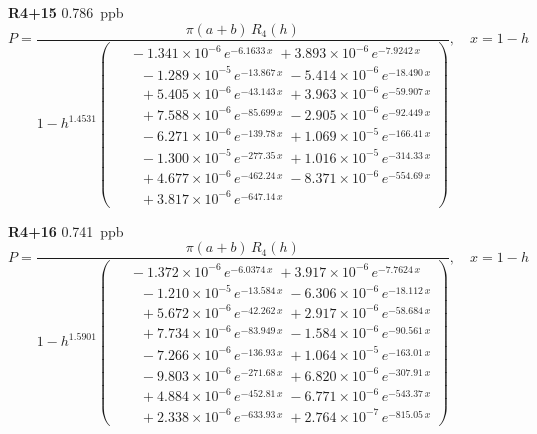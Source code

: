 \documentclass[12pt]{article}
\begin{document}
\noindent\textbf{R4+15} 0.786~ppb\nopagebreak
\begin{equation*}
P = \frac{\pi(a{+}b)\,R_4(h)}{1 - h^{1.4531}\!\left(\!\begin{aligned}
  &\; -1.341{\times}10^{-6}\,e^{-6.1633\,x} \; +3.893{\times}10^{-6}\,e^{-7.9242\,x} \\[-3pt]
  &\quad -1.289{\times}10^{-5}\,e^{-13.867\,x} \; -5.414{\times}10^{-6}\,e^{-18.490\,x} \\[-3pt]
  &\quad +5.405{\times}10^{-6}\,e^{-43.143\,x} \; +3.963{\times}10^{-6}\,e^{-59.907\,x} \\[-3pt]
  &\quad +7.588{\times}10^{-6}\,e^{-85.699\,x} \; -2.905{\times}10^{-6}\,e^{-92.449\,x} \\[-3pt]
  &\quad -6.271{\times}10^{-6}\,e^{-139.78\,x} \; +1.069{\times}10^{-5}\,e^{-166.41\,x} \\[-3pt]
  &\quad -1.300{\times}10^{-5}\,e^{-277.35\,x} \; +1.016{\times}10^{-5}\,e^{-314.33\,x} \\[-3pt]
  &\quad +4.677{\times}10^{-6}\,e^{-462.24\,x} \; -8.371{\times}10^{-6}\,e^{-554.69\,x} \\[-3pt]
  &\quad +3.817{\times}10^{-6}\,e^{-647.14\,x}
\end{aligned}\!\right)}, \quad x = 1{-}h
\end{equation*}

\noindent\textbf{R4+16} 0.741~ppb\nopagebreak
\begin{equation*}
P = \frac{\pi(a{+}b)\,R_4(h)}{1 - h^{1.5901}\!\left(\!\begin{aligned}
  &\; -1.372{\times}10^{-6}\,e^{-6.0374\,x} \; +3.917{\times}10^{-6}\,e^{-7.7624\,x} \\[-3pt]
  &\quad -1.210{\times}10^{-5}\,e^{-13.584\,x} \; -6.306{\times}10^{-6}\,e^{-18.112\,x} \\[-3pt]
  &\quad +5.672{\times}10^{-6}\,e^{-42.262\,x} \; +2.917{\times}10^{-6}\,e^{-58.684\,x} \\[-3pt]
  &\quad +7.734{\times}10^{-6}\,e^{-83.949\,x} \; -1.584{\times}10^{-6}\,e^{-90.561\,x} \\[-3pt]
  &\quad -7.266{\times}10^{-6}\,e^{-136.93\,x} \; +1.064{\times}10^{-5}\,e^{-163.01\,x} \\[-3pt]
  &\quad -9.803{\times}10^{-6}\,e^{-271.68\,x} \; +6.820{\times}10^{-6}\,e^{-307.91\,x} \\[-3pt]
  &\quad +4.884{\times}10^{-6}\,e^{-452.81\,x} \; -6.771{\times}10^{-6}\,e^{-543.37\,x} \\[-3pt]
  &\quad +2.338{\times}10^{-6}\,e^{-633.93\,x} \; +2.764{\times}10^{-7}\,e^{-815.05\,x}
\end{aligned}\!\right)}, \quad x = 1{-}h
\end{equation*}
\end{document}
